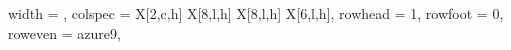 \documentclass[a4paper]{ctexbook}
\begin{document}
\begin{landscape}
{\begin{longtblr}[
      caption = {Four-word and Longer Lexical Bundles in Steps},
      label = {tab:Four-word and Longer Lexical Bundles in Steps},
  ]{
      width = \linewidth,
      colspec = {X[2,c,h]  X[8,l,h]  X[8,l,h]  X[6,l,h]},
      rowhead = 1, rowfoot = 0, %
      row{even} = {azure9},
  }
  \bottomrule
  
  \end{longtblr}



  


}
\end{landscape}
\end{document}
